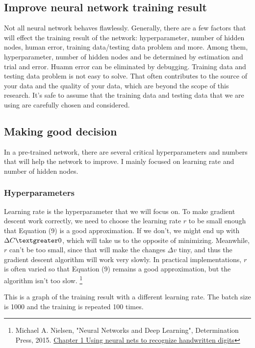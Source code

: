 \documentclass[]{article}
\begin{document}
\begin{multicols}{2}
\section{Improve neural network training result}
Not all neural network behaves flawlessly. Generally, there are a few factors that will effect the training result of the network: hyperparameter, number of hidden nodes, human error, training data/testing data problem and more. Among them, hyperparameter, number of hidden nodes and be determined by estimation and trial and error. Huamn error can be eliminated by debugging. Training data and testing data problem is not easy to solve. That often contributes to the source of your data and the quality of your data, which are beyond the scope of this research. It's safe to assume that the training data and testing data that we are using are carefully chosen and considered.  
\subsection{Making good decision}
In a pre-trained network, there are several critical hyperparameters and numbers that will help the network to improve. I mainly focused on learning rate and number of hidden nodes. 
\subsubsection{Hyperparameters}
Learning rate is the hyperparameter that we will focus on. To make gradient descent work correctly, we need to choose the learning rate \(r\) to be small enough that Equation (9) is a good approximation. If we don't, we might end up with \(\Delta C \textgreater 0\), which will take us to the opposite of minimizing. Meanwhile,  \(r\) can't be too small, since that will make the changes \(\Delta v\) tiny, and thus the gradient descent algorithm will work very slowly. In practical implementations, \(r\) is often varied so that Equation (9) remains a good approximation, but the algorithm isn't too slow. \footnote{Michael A. Nielsen, "Neural Networks and Deep Learning", Determination Press, 2015. \href{http://neuralnetworksanddeeplearning.com/chap1.html}{Chapter 1 Using neural nets to recognize handwritten digits}}

This is a graph of the training result with a different learning rate. The batch size is 1000 and the training is repeated 100 times. 


\end{multicols}
\end{document}
